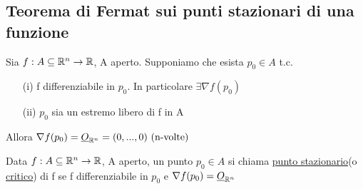\subsection{Teorema di Fermat sui punti stazionari di una funzione}
\begin{theorem}[Fermat]
  Sia $f: A \subseteq \mathbb{R}^n \to \mathbb{R}$, A aperto. Supponiamo che esista $p_0 \in A$ t.c. 
  \begin{enumerate}
    \item[(i)] f differenziabile in $p_0$. In particolare $\exists \nabla f(p_0)$
    \item[(ii)] $p_0$ sia un estremo libero di f in A
  \end{enumerate}
  Allora $\nabla f(p_0) = \underline{O}_{\mathbb{R}^n} = (0,...,0) \text{ (n-volte)}$
\end{theorem}
\begin{definition}
  Data $f: A \subseteq \mathbb{R}^n \to \mathbb{R}$, A aperto, un punto $p_0\in A$ si chiama \underline{punto stazionario}(o \underline{critico}) 
  di f se f \ace differenziabile in $p_0$ e $\nabla f(p_0) = \underline{O}_{\mathbb{R}^n}$
\end{definition}